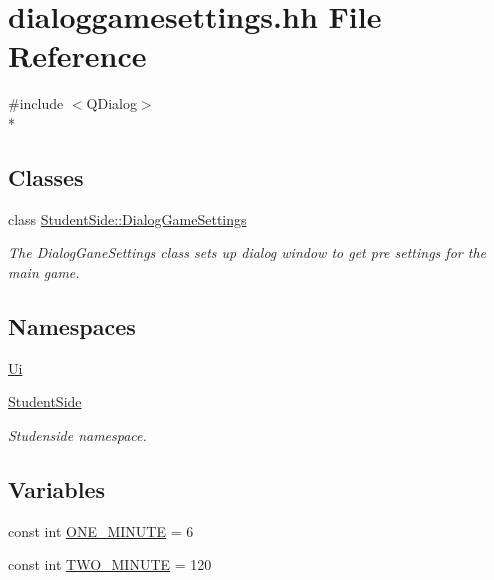 \hypertarget{dialoggamesettings_8hh}{\section{dialoggamesettings.\-hh File Reference}
\label{dialoggamesettings_8hh}
}
{\ttfamily \#include $<$Q\-Dialog$>$}\\*
\subsection*{Classes}
\begin{DoxyCompactItemize}
\item 
class \hyperlink{class_student_side_1_1_dialog_game_settings}{Student\-Side\-::\-Dialog\-Game\-Settings}
\begin{DoxyCompactList}\small\item\em The Dialog\-Gane\-Settings class sets up dialog window to get pre settings for the main game. \end{DoxyCompactList}\end{DoxyCompactItemize}
\subsection*{Namespaces}
\begin{DoxyCompactItemize}
\item 
\hyperlink{namespace_ui}{Ui}
\item 
\hyperlink{namespace_student_side}{Student\-Side}
\begin{DoxyCompactList}\small\item\em Studenside namespace. \end{DoxyCompactList}\end{DoxyCompactItemize}
\subsection*{Variables}
\begin{DoxyCompactItemize}
\item 
const int \hyperlink{dialoggamesettings_8hh_a8b40e2e7fdfe4c765aa9aaa6fec9b431}{O\-N\-E\-\_\-\-M\-I\-N\-U\-T\-E} = 6
\item 
const int \hyperlink{dialoggamesettings_8hh_aedc05529ef6072630839aed27d71b5ae}{T\-W\-O\-\_\-\-M\-I\-N\-U\-T\-E} = 120
\end{DoxyCompactItemize}


